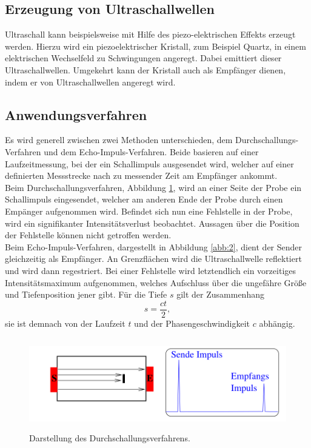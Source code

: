 \subsection{Erzeugung von Ultraschallwellen}
Ultraschall kann beispielsweise mit Hilfe des piezo-elektrischen Effekts erzeugt werden.
Hierzu wird ein piezoelektrischer Kristall, zum Beispiel Quartz, in einem elektrischen Wechselfeld zu Schwingungen angeregt.
Dabei emittiert dieser Ultraschallwellen.
Umgekehrt kann der Kristall auch als Empfänger dienen, indem er von Ultraschallwellen angeregt wird.

\subsection{Anwendungsverfahren}
Es wird generell zwischen zwei Methoden unterschieden, dem Durchschallungs-Verfahren und dem Echo-Impuls-Verfahren.
Beide basieren auf einer Laufzeitmessung, bei der ein Schallimpuls ausgesendet wird, welcher auf einer definierten Messstrecke nach zu messender Zeit am Empfänger ankommt.\\
Beim Durchschallungsverfahren, Abbildung \ref{abb:1}, wird an einer Seite der Probe ein Schallimpuls eingesendet, welcher am anderen Ende der Probe durch einen Empänger aufgenommen wird.
Befindet sich nun eine Fehlstelle in der Probe, wird ein signifikanter Intensitätsverlust beobachtet.
Aussagen über die Position der Fehlstelle können nicht getroffen werden.\\
Beim Echo-Impuls-Verfahren, dargestellt in Abbildung \ref{abb:2}, dient der Sender gleichzeitig als Empfänger.
An Grenzflächen wird die Ultraschallwelle reflektiert und wird dann regestriert.
Bei einer Fehlstelle wird letztendlich ein vorzeitiges Intensitätsmaximum aufgenommen, welches Aufschluss über die ungefähre Größe und Tiefenposition jener gibt.
Für die Tiefe $s$ gilt der Zusammenhang
\begin{equation}
  s = \frac{ct}{2},
\end{equation}
sie ist demnach von der Laufzeit $t$ und der Phasengeschwindigkeit $c$ abhängig.

\begin{figure}[H]
  \centering
  \includegraphics[height=4cm]{ressources/durch.png}
  \caption{Darstellung des Durchschallungsverfahrens. \cite{skript}}
  \label{abb:1}
\end{figure}

